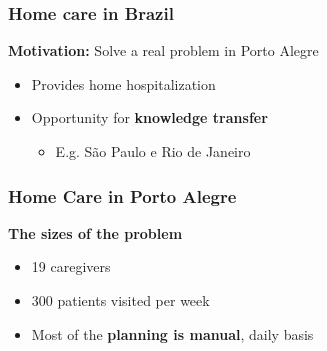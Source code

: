 \begin{frame}
   \frametitle{Home care in Brazil}

   \textbf{Motivation: } Solve a real problem in Porto Alegre

%
   \begin{itemize}
      \item Provides home hospitalization
      \item Opportunity for \textbf{knowledge transfer}
      \begin{itemize}
         \item E.g. São Paulo e Rio de Janeiro
      \end{itemize}
   \end{itemize}

\end{frame}

\begin{frame}
   \frametitle{Home Care in Porto Alegre}

   \textbf{The sizes of the problem}
   \begin{itemize}
      \item 19 caregivers %
      \item 300 patients visited per week
      \item Most of the \textbf{planning is manual}, daily basis
   \end{itemize}


\end{frame}

